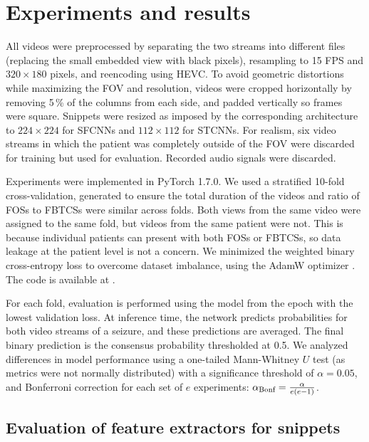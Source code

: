 \section{Experiments and results}

All videos were preprocessed by
separating the two streams into different files (replacing the small embedded view with black pixels),
resampling to 15 \ac{FPS} and $320 \times 180$ pixels,
and reencoding using \ac{HEVC}.
To avoid geometric distortions while maximizing the \ac{FOV} and resolution, videos were cropped horizontally by removing 5\,\% of the columns from each side, and padded vertically so frames were square.
Snippets were resized as imposed by the corresponding architecture to $224 \times 224$ for \acp{SFCNN} and  $112 \times 112$ for \acp{STCNN}.
For realism, six video streams in which the patient was completely outside of the \ac{FOV} were discarded for training but used for evaluation.
Recorded audio signals were discarded.

Experiments were implemented in PyTorch 1.7.0.
We used a stratified 10-fold cross-validation, generated to ensure the total duration of the videos and ratio of \acp{FOS} to \acp{FBTCS} were similar across folds.
Both views from the same video were assigned to the same fold, but videos from the same patient were not.
This is because individual patients can present with both \acp{FOS} or \acp{FBTCS}, so data leakage at the patient level is not a concern.
We minimized the weighted binary cross-entropy loss to overcome dataset imbalance, using the AdamW optimizer \cite{loshchilov_decoupled_2017}.
The code is available at .

For each fold, evaluation is performed using the model from the epoch with the lowest validation loss.
At inference time, the network predicts probabilities for both video streams of a seizure, and these predictions are averaged.
The final binary prediction is the consensus probability thresholded at 0.5.
We analyzed differences in model performance using a one-tailed Mann-Whitney $U$ test (as metrics were not normally distributed) with a significance threshold of $\alpha = 0.05$, and Bonferroni correction for each set of $e$ experiments: $\alpha_{\text{Bonf}} = \frac{\alpha}{e (e - 1)}$.


\subsection{Evaluation of feature extractors for snippets}
\label{sec:exp_feat}

